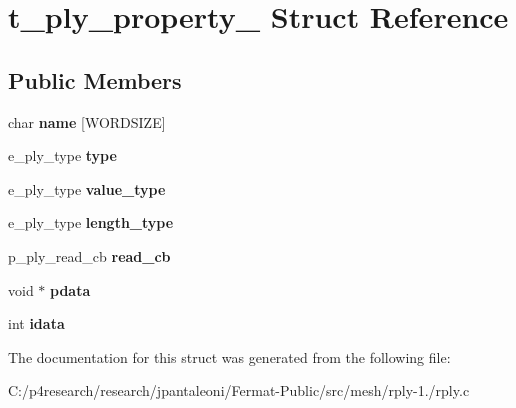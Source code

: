 \hypertarget{structt__ply__property__}{}\section{t\+\_\+ply\+\_\+property\+\_\+ Struct Reference}
\label{structt__ply__property__}
\subsection*{Public Members}
\begin{DoxyCompactItemize}
\item 
\mbox{\label{structt__ply__property___a9093045e79e9eafa04d290b7bdc2e83b}} 
char {\bfseries name} \mbox{[}W\+O\+R\+D\+S\+I\+ZE\mbox{]}
\item 
\mbox{\label{structt__ply__property___a7021be56bf6726be847887cfbba0d24e}} 
e\+\_\+ply\+\_\+type {\bfseries type}
\item 
\mbox{\label{structt__ply__property___a3caa07217f713492cf06016c7654e87f}} 
e\+\_\+ply\+\_\+type {\bfseries value\+\_\+type}
\item 
\mbox{\label{structt__ply__property___af9b3b45ae24c1fd7d9d81a18bc3f76a7}} 
e\+\_\+ply\+\_\+type {\bfseries length\+\_\+type}
\item 
\mbox{\label{structt__ply__property___af139cc44e475f4754daf7501e1288716}} 
p\+\_\+ply\+\_\+read\+\_\+cb {\bfseries read\+\_\+cb}
\item 
\mbox{\label{structt__ply__property___af53fa1cccd547dddd25d2ea111fd3159}} 
void $\ast$ {\bfseries pdata}
\item 
\mbox{\label{structt__ply__property___ad570a40f132c281416b2af4a9e1ddbea}} 
int {\bfseries idata}
\end{DoxyCompactItemize}


The documentation for this struct was generated from the following file\+:\begin{DoxyCompactItemize}
\item 
C\+:/p4research/research/jpantaleoni/\+Fermat-\/\+Public/src/mesh/rply-\/1./rply.\+c\end{DoxyCompactItemize}
